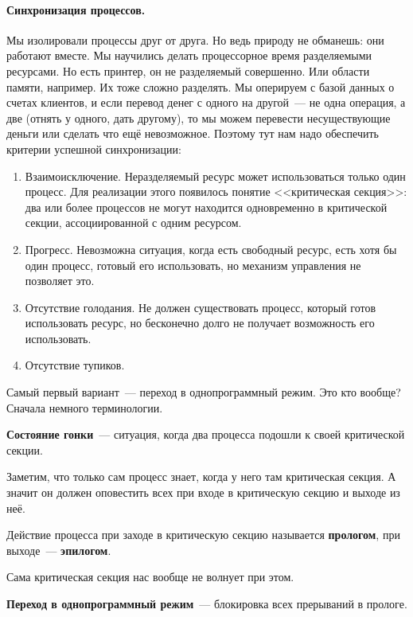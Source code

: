 \documentclass{article}
\begin{document}
    \paragraph{Синхронизация процессов.}
    Мы изолировали процессы друг от друга. Но ведь природу не обманешь: они работают вместе. Мы научились делать процессорное время разделяемыми ресурсами. Но есть принтер, он не разделяемый совершенно. Или области памяти, например. Их тоже сложно разделять. Мы оперируем с базой данных о счетах клиентов, и если перевод денег с одного на другой~--- не одна операция, а две (отнять у одного, дать другому), то мы можем перевести несуществующие деньги или сделать что ещё невозможное. Поэтому тут нам надо обеспечить критерии успешной синхронизации:
    \begin{enumerate}
        \item Взаимоисключение. Неразделяемый ресурс может использоваться только один процесс. Для реализации этого появилось понятие <<критическая секция>>: два или более процессов не могут находится одновременно в критической секции, ассоциированной с одним ресурсом.
        \item Прогресс. Невозможна ситуация, когда есть свободный ресурс, есть хотя бы один процесс, готовый его использовать, но механизм управления не позволяет это.
        \item Отсутствие голодания. Не должен существовать процесс, который готов использовать ресурс, но бесконечно долго не получает возможность его использовать.
        \item Отсутствие тупиков.
    \end{enumerate}
    Самый первый вариант~--- переход в однопрограммный режим. Это кто вообще? Сначала немного терминологии.\\
    \begin{definition}
        \textbf{Состояние гонки}~--- ситуация, когда два процесса подошли к своей критической секции.
    \end{definition}
    Заметим, что только сам процесс знает, когда у него там критическая секция. А значит он должен оповестить всех при входе в критическую секцию и выходе из неё. 
    \begin{definition}
        Действие процесса при заходе в критическую секцию называется \textbf{прологом}, при выходе~--- \textbf{эпилогом}.
    \end{definition}
    Сама критическая секция нас вообще не волнует при этом.
    \begin{definition}
        \textbf{Переход в однопрограммный режим}~--- блокировка всех прерываний в прологе.
    \end{definition}
\end{document}
